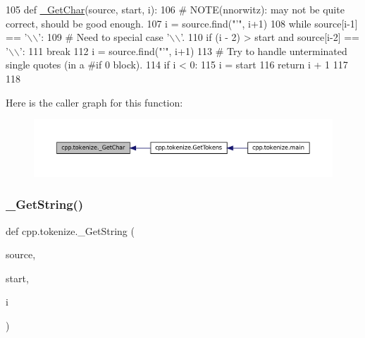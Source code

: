 \begin{DoxyCode}
105 \textcolor{keyword}{def }\hyperlink{namespacecpp_1_1tokenize_abeb75f493bd3035922daf150f5213ba9}{\_GetChar}(source, start, i):
106     \textcolor{comment}{# NOTE(nnorwitz): may not be quite correct, should be good enough.}
107     i = source.find(\textcolor{stringliteral}{"'"}, i+1)
108     \textcolor{keywordflow}{while} source[i-1] == \textcolor{stringliteral}{'\(\backslash\)\(\backslash\)'}:
109         \textcolor{comment}{# Need to special case '\(\backslash\)\(\backslash\)'.}
110         \textcolor{keywordflow}{if} (i - 2) > start \textcolor{keywordflow}{and} source[i-2] == \textcolor{stringliteral}{'\(\backslash\)\(\backslash\)'}:
111             \textcolor{keywordflow}{break}
112         i = source.find(\textcolor{stringliteral}{"'"}, i+1)
113     \textcolor{comment}{# Try to handle unterminated single quotes (in a #if 0 block).}
114     \textcolor{keywordflow}{if} i < 0:
115         i = start
116     \textcolor{keywordflow}{return} i + 1
117 
118 
\end{DoxyCode}
Here is the caller graph for this function\+:
\nopagebreak
\begin{figure}[H]
\begin{center}
\leavevmode
\includegraphics[width=350pt]{namespacecpp_1_1tokenize_abeb75f493bd3035922daf150f5213ba9_icgraph}
\end{center}
\end{figure}
\mbox{\label{namespacecpp_1_1tokenize_a3c6a8b154110b4b6a0385ccc3469db77}} 
\subsubsection{\texorpdfstring{\+\_\+\+Get\+String()}{\_GetString()}}
{\footnotesize\ttfamily def cpp.\+tokenize.\+\_\+\+Get\+String (\begin{DoxyParamCaption}\item[{}]{source,  }\item[{}]{start,  }\item[{}]{i }\end{DoxyParamCaption})\hspace{0.3cm}{\ttfamily [private]}}



